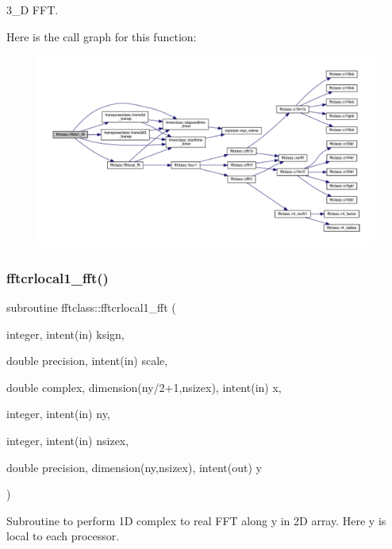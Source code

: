 3\+\_\+D F\+FT. 

Here is the call graph for this function\+:\nopagebreak
\begin{figure}[H]
\begin{center}
\leavevmode
\includegraphics[width=350pt]{namespacefftclass_acef38aed3ece8d2c1120ce0004e6297e_cgraph}
\end{center}
\end{figure}
\mbox{\label{namespacefftclass_a25ecfa928dd28501b9c251c1e887996b}} 
\subsubsection{\texorpdfstring{fftcrlocal1\_fft()}{fftcrlocal1\_fft()}}
{\footnotesize\ttfamily subroutine fftclass\+::fftcrlocal1\+\_\+fft (\begin{DoxyParamCaption}\item[{integer, intent(in)}]{ksign,  }\item[{double precision, intent(in)}]{scale,  }\item[{double complex, dimension(ny/2+1,nsizex), intent(in)}]{x,  }\item[{integer, intent(in)}]{ny,  }\item[{integer, intent(in)}]{nsizex,  }\item[{double precision, dimension(ny,nsizex), intent(out)}]{y }\end{DoxyParamCaption})}



Subroutine to perform 1D complex to real F\+FT along y in 2D array. Here y is local to each processor. 

